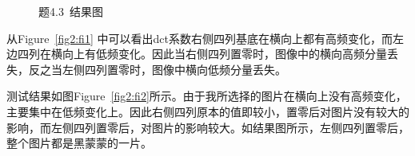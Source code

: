 \documentclass[a4paper]{article}
\begin{document}
	\begin{figure}[h]
		\centering
		\hspace{0.3cm}
		\caption{题4.3~结果图}
		\label{fig2}
	\end{figure}
	从Figure~\ref{fig2:fi1} \citep{wiki2016wiki}中可以看出dct系数右侧四列基底在横向上都有高频变化，而左边四列在横向上有低频变化。因此当右侧四列置零时，图像中的横向高频分量丢失，反之当左侧四列置零时，图像中横向低频分量丢失。
	
	测试结果如图Figure~\ref{fig2:fi2}所示。由于我所选择的图片在横向上没有高频变化，主要集中在低频变化上。因此右侧四列原本的值即较小，置零后对图片没有较大的影响，而左侧四列置零后，对图片的影响较大。如结果图所示，左侧四列置零后，整个图片都是黑蒙蒙的一片。
	
\end{document}
